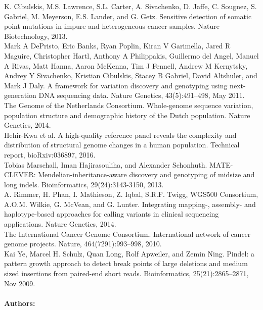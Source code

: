 \noindent 
[1] K. Cibulskis, M.S. Lawrence, S.L. Carter, A. Sivachenko, D. Jaffe, C. Sougnez, S. Gabriel, M. Meyerson, E.S. Lander, and G. Getz. Sensitive detection of somatic point mutations in impure and heterogeneous cancer samples. Nature Biotechnology, 2013.\\

\noindent
[2] Mark A DePristo, Eric Banks, Ryan Poplin, Kiran V Garimella, Jared R Maguire, Christopher Hartl,
Anthony A Philippakis, Guillermo del Angel, Manuel A Rivas, Matt Hanna, Aaron McKenna, Tim J
Fennell, Andrew M Kernytsky, Andrey Y Sivachenko, Kristian Cibulskis, Stacey B Gabriel, David
Altshuler, and Mark J Daly. A framework for variation discovery and genotyping using next-generation
DNA sequencing data. Nature Genetics, 43(5):491–498, May 2011.\\

\noindent
[3] The Genome of the Netherlands Consortium. Whole-genome sequence variation, population structure
and demographic history of the Dutch population. Nature Genetics, 2014.\\

\noindent
[4] Hehir-Kwa et al. A high-quality reference panel reveals the complexity and distribution of structural
genome changes in a human population. Technical report, bioRxiv:036897, 2016.\\

\noindent
[5] Tobias Marschall, Iman Hajirasouliha, and Alexander Schonhuth. MATE-CLEVER: Mendelian-inheritance-aware discovery and genotyping of midsize and long indels. Bioinformatics, 29(24):3143-3150, 2013.\\

\noindent
[6] A. Rimmer, H. Phan, I. Mathieson, Z. Iqbal, S.R.F. Twigg, WGS500 Consortium, A.O.M. Wilkie,
G. McVean, and G. Lunter. Integrating mapping-, assembly- and haplotype-based approaches for calling
variants in clinical sequencing applications. Nature Genetics, 2014.\\

\noindent
[7] The International Cancer Genome Consortium. International network of cancer genome projects. Nature, 464(7291):993–998, 2010.\\

\noindent
[8] Kai Ye, Marcel H. Schulz, Quan Long, Rolf Apweiler, and Zemin Ning. Pindel: a pattern growth
approach to detect break points of large deletions and medium sized insertions from paired-end short
reads. Bioinformatics, 25(21):2865–2871, Nov 2009.


\noindent \paragraph{Authors:} 

